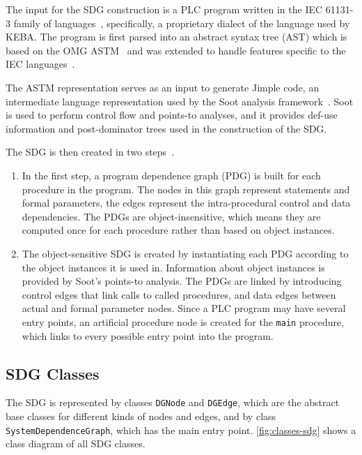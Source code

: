 The input for the SDG construction is a PLC program written in the IEC 61131-3 family of 
languages~\cite{IEC61131:2003}, specifically, a proprietary dialect of the language used by KEBA. The program is first 
parsed into an abstract syntax tree (AST) which is based on the OMG ASTM~\cite{ASTM} and was extended to handle 
features specific to the IEC languages~\cite[ch.~4]{GrimmerDA}. 

The ASTM representation serves as an input to generate Jimple code, an intermediate language representation used by the 
Soot analysis framework~\cite{Soot}. Soot is used to perform control flow and points-to analyses, and it provides 
def-use information and post-dominator trees used in the construction of the SDG.

The SDG is then created in two steps~\cite[ch.~6]{GrimmerDA}.

\begin{enumerate}
  \item In the first step, a program dependence graph (PDG) is built for each procedure in the program. The nodes in 
  this graph represent statements and formal parameters, the edges represent the intra-procedural control and data 
  dependencies. The PDGs are object-insensitive, which means they are computed once for each procedure rather than 
  based on object instances.
  
  \item The object-sensitive SDG is created by instantiating each PDG according to the object instances 
  it is used in. Information about object instances is provided by Soot's points-to analysis. The PDGs are linked by 
  introducing control edges that link calls to called procedures, and data edges between actual and formal parameter 
  nodes. Since a PLC program may have several entry points, an artificial procedure node is created for the 
  \lstinline|main| procedure, which links to every possible entry point into the program.
\end{enumerate}

\subsection{SDG Classes} \label{sec:classes}

The SDG is represented by classes \lstinline|DGNode| and \lstinline|DGEdge|, which are the abstract base classes for 
different kinds of nodes and edges, and by class \lstinline|SystemDependenceGraph|, which has the main entry point. 
\autoref{fig:classes-sdg} shows a class diagram of all SDG classes.

